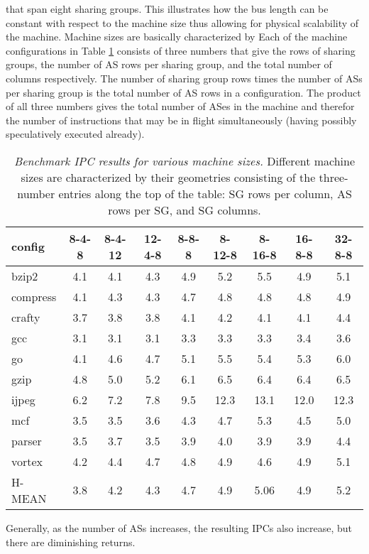 \documentclass[10pt,dvips]{article}
\begin{document}
that span eight sharing groups.  This illustrates how the bus
length can be constant with respect to the machine size thus allowing
for physical scalability of the machine.
Machine sizes are basically characterized by
Each of the machine configurations in Table \ref{tab:ipc1} consists of three
numbers that give the rows of sharing groups, the number
of AS rows per sharing group, and the total number of 
columns respectively.  The number of sharing group rows times the
number of ASs per sharing group is the total number of
AS rows in a configuration.  The product of all three
numbers gives the total number of ASes in the machine and therefor
the number of instructions that may be in flight 
simultaneously
(having
possibly speculatively executed already).
%
\begin{table}
\begin{center}
\caption{{\em Benchmark IPC results for various machine sizes.}
Different machine sizes are characterized by their
geometries consisting of the three-number entries along the
top of the table: SG rows per column, AS rows per SG, and
SG columns.}
\label{tab:ipc1}
\vspace{+0.1in}
\begin{tabular}{|l|c|c|c|c|c|c|c|c|}
\hline 
config&
8-4-8&8-4-12&12-4-8&8-8-8&8-12-8&8-16-8&16-8-8&32-8-8\\
\hline
\hline 
bzip2&4.1&4.1&4.3&4.9&5.2&5.5&4.9&5.1\\
\hline 
compress&4.1&4.3&4.3&4.7&4.8&4.8&4.8&4.9\\
\hline 
crafty&3.7&3.8&3.8&4.1&4.2&4.1&4.1&4.4\\
\hline 
gcc&3.1&3.1&3.1&3.3&3.3&3.3&3.4&3.6\\
\hline 
go&4.1&4.6&4.7&5.1&5.5&5.4&5.3&6.0\\
\hline 
gzip&4.8&5.0&5.2&6.1&6.5&6.4&6.4&6.5\\
\hline 
ijpeg&6.2&7.2&7.8&9.5&12.3&13.1&12.0&12.3\\
\hline 
mcf&3.5&3.5&3.6&4.3&4.7&5.3&4.5&5.0\\
\hline 
parser&3.5&3.7&3.5&3.9&4.0&3.9&3.9&4.4\\
\hline 
vortex&4.2&4.4&4.7&4.8&4.9&4.6&4.9&5.1\\
\hline 
\hline 
H-MEAN&3.8&4.2&4.3&4.7&4.9&5.06&4.9&5.2\\
\hline
\end{tabular}
\end{center}
\end{table}
%
Generally, as the number of ASs increases,
the resulting IPCs also increase, but there are diminishing returns.
\end{document}
